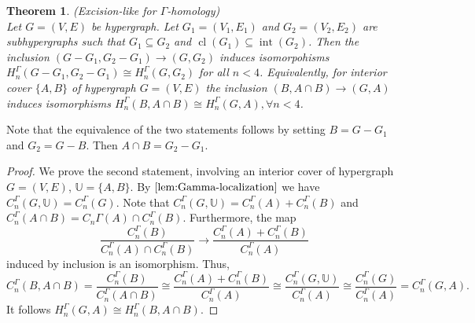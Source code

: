 \documentclass[10pt,a4paper]{amsart}
\newtheorem{thm}{Theorem}[section]
\newcommand{\cl}{\operatorname{cl}}
\renewcommand{\int}{\operatorname{int}}
\begin{document}
\medskip

\begin{thm}\label{gamma excision}
	(Excision-like for $\Gamma$-homology)\\
	Let $G=(V,E)$ be hypergraph. Let $G_1=(V_1,E_1)$ and $G_2=(V_2,E_2)$ are  subhypergraphs such that $G_1\subseteq G_2$ and $\cl(G_1)\subseteq \int(G_2)$. Then the inclusion $(G-G_1,G_2-G_1)\rightarrow (G,G_2)$ induces isomorpohisms $H_{n}^\Gamma(G-G_1,G_2-G_1)\cong H_{n}^\Gamma(G,G_2)$ for all $n<4$. Equivalently, for interior cover $\{A,B\}$ of hypergraph $G=(V,E)$ the inclusion $(B,A\cap B)\rightarrow (G,A)$ induces isomorphisms $H_{n}^\Gamma(B,A\cap B)\cong H_{n}^\Gamma(G,A), \forall n<4$.
\end{thm}

Note that the equivalence of the two statements follows by setting $B = G-G_1$ and $G_2=G-B$. Then $A\cap B=G_2-G_1$. 

\begin{proof}\label{excision proof}
	We prove the second statement, involving an interior cover of hypergraph $G=(V,E)$, $\mathbb{U}=\{A,B\}$. By $\ref{lem:Gamma-localization}$ we have $C_{n}^\Gamma(G,\mathbb{U})=C_{n}^\Gamma(G)$. Note that $C_{n}^\Gamma(G,\mathbb{U})=C_{n}^\Gamma(A)+C_{n}^\Gamma(B)$ and $C_{n}^\Gamma(A\cap B)=C_{n}\Gamma(A)\cap C_{n}^\Gamma(B)$. Furthermore, the map \[\frac{C_{n}^\Gamma(B)}{C_{n}^\Gamma(A)\cap C_{n}^\Gamma(B)}\rightarrow \frac{C_{n}^\Gamma(A)+C_{n}^\Gamma(B)}{C_{n}^\Gamma(A)}\] induced by inclusion is an isomorphism. Thus,
	\[C_{n}^\Gamma(B,A\cap B)=\frac{C_{n}^\Gamma(B)}{C_{n}^\Gamma(A\cap B)}\cong \frac{C_{n}^\Gamma(A)+C_{n}^\Gamma(B)}{C_{n}^\Gamma(A)}\cong \frac{C_{n}^\Gamma(G,\mathbb{U})}{C_{n}^\Gamma(A)}\cong \frac{C_{n}^\Gamma(G)}{C_{n}^\Gamma(A)}=C_{n}^\Gamma(G,A).\] It follows $H_{n}^\Gamma(G,A)\cong H_{n}^\Gamma(B,A\cap B)$.	
\end{proof}


\medskip
\end{document}

